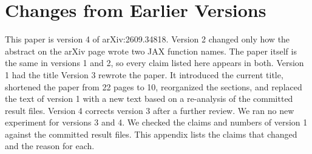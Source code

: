 \section{Changes from Earlier Versions}\label{app:changes}
This paper is version 4 of arXiv:2609.34818. Version 2 changed only how the abstract on the arXiv page wrote two JAX
function names. The paper itself is the same in versions 1 and 2, so every claim listed here appears in both. %
Version 1 had the title 
Version 3 rewrote the paper. It introduced the current title, shortened the paper from 22 pages to 10, reorganized the sections, and replaced the text of version 1 with a new text based on a re-analysis of the committed result files. %
Version 4 corrects version 3 after a further review. We ran no new experiment for versions 3 and 4. We checked the claims and numbers of version 1 against the committed result files. This appendix
lists the claims that changed and the reason for each.

